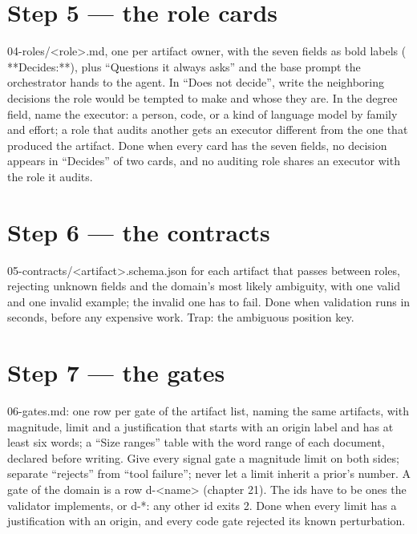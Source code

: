 \documentclass[
  american,
  10pt,
]{report}
\renewcommand{\texttt}[1]{{\ttfamily\hyphenchar\font=-1 #1}}
\begin{document}
\section{Step 5 --- the role cards}\label{step-5-the-role-cards}

\texttt{04-\allowbreak{}roles/\allowbreak{}<role>.\allowbreak{}md}, one
per artifact owner, with the seven fields as bold labels
(\texttt{**Decides:\allowbreak{}**}), plus ``Questions it always asks''
and the base prompt the orchestrator hands to the agent. In ``Does not
decide'', write the neighboring decisions the role would be tempted to
make and whose they are. In the degree field, name the executor: a
person, code, or a kind of language model by family and effort; a role
that audits another gets an executor different from the one that
produced the artifact. Done when every card has the seven fields, no
decision appears in ``Decides'' of two cards, and no auditing role
shares an executor with the role it audits.

\section{Step 6 --- the contracts}\label{step-6-the-contracts}

\texttt{05-\allowbreak{}contracts/\allowbreak{}<artifact>.\allowbreak{}schema.\allowbreak{}json}
for each artifact that passes between roles, rejecting unknown fields
and the domain's most likely ambiguity, with one valid and one invalid
example; the invalid one has to fail. Done when validation runs in
seconds, before any expensive work. Trap: the ambiguous position key.

\section{Step 7 --- the gates}\label{step-7-the-gates}

\texttt{06-\allowbreak{}gates.\allowbreak{}md}: one row per gate of the
artifact list, naming the same artifacts, with magnitude, limit and a
justification that starts with an origin label and has at least six
words; a ``Size ranges'' table with the word range of each document,
declared before writing. Give every signal gate a magnitude limit on
both sides; separate ``rejects'' from ``tool failure''; never let a
limit inherit a prior's number. A gate of the domain is a row
\texttt{d-\allowbreak{}<name>} (chapter 21). The ids have to be ones the
validator implements, or \texttt{d-\allowbreak{}*}: any other id exits
2. Done when every limit has a justification with an origin, and every
code gate rejected its known perturbation.
\end{document}
